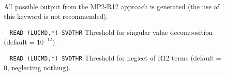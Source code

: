 \begin{description}
\item[]

All possible output from the MP2-R12 approach is generated (the 
use of this keyword is not recommended).

\item[]  \verb| | \newline
\verb|READ (LUCMD,*) SVDTHR|\newline
Threshold for singular value decomposition (default = $10^{-12}$).

\item[]  \verb| | \newline
\verb|READ (LUCMD,*) SVDTHR|\newline
Threshold for neglect of R12 terms (default = 0, neglecting nothing).

\end{description}

